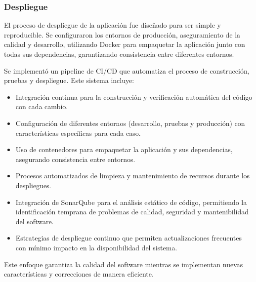 \subsubsection{Despliegue}
El proceso de despliegue de la aplicación fue diseñado para ser simple y reproducible. Se configuraron los entornos de producción, aseguramiento de la calidad y desarrollo, utilizando Docker para empaquetar la aplicación junto con todas sus dependencias, garantizando consistencia entre diferentes entornos.

Se implementó un pipeline de CI/CD que automatiza el proceso de construcción, pruebas y despliegue. Este sistema incluye:

\begin{itemize}
    \item Integración continua para la construcción y verificación automática del código con cada cambio.
    \item Configuración de diferentes entornos (desarrollo, pruebas y producción) con características específicas para cada caso.
    \item Uso de contenedores para empaquetar la aplicación y sus dependencias, asegurando consistencia entre entornos.
    \item Procesos automatizados de limpieza y mantenimiento de recursos durante los despliegues.
    \item Integración de SonarQube para el análisis estático de código, permitiendo la identificación temprana de problemas de calidad, seguridad y mantenibilidad del software.
    \item Estrategias de despliegue continuo que permiten actualizaciones frecuentes con mínimo impacto en la disponibilidad del sistema.
\end{itemize}

Este enfoque garantiza la calidad del software mientras se implementan nuevas características y correcciones de manera eficiente.
